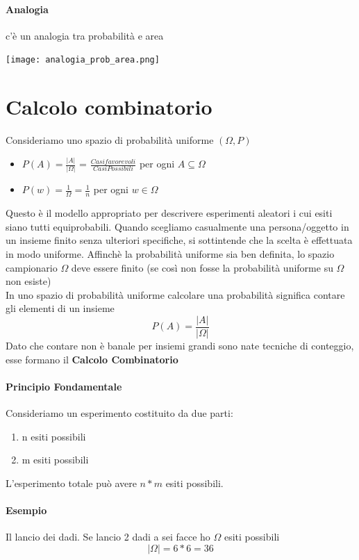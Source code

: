 \documentclass[12pt, a4paper, openany]{book}
\begin{document}
\paragraph{Analogia} c'è un analogia tra probabilità e area
\begin{center}
    \texttt{[image: analogia\_prob\_area.png]}
\end{center}

\section{Calcolo combinatorio}
Consideriamo uno spazio di probabilità uniforme $(\Omega, P)$
\begin{itemize}
    \item $P(A) = \frac{|A|}{|\Omega|}$ = $\frac{Casi favorevoli}{Casi Possibili}$
    per ogni $A \subseteq \Omega$
    \item $P({w}) = \frac{1}{\Omega} = \frac{1}{n}$ per ogni $w \in \Omega$
\end{itemize}
Questo è il modello appropriato per descrivere esperimenti aleatori i cui esiti
siano tutti equiprobabili. Quando scegliamo casualmente una persona/oggetto in un 
insieme finito senza ulteriori specifiche, si sottintende che la scelta è effettuata
in modo uniforme.
Affinchè la probabilità uniforme sia ben definita, lo spazio campionario $\Omega$
deve essere finito (se così non fosse la probabilità uniforme su $\Omega$ non esiste)
\\ In uno spazio di probabilità uniforme calcolare una probabilità significa contare gli 
elementi di un insieme
\begin{equation}
    P(A) = \frac{|A|}{|\Omega|}
\end{equation}
Dato che contare non è banale per insiemi grandi sono nate tecniche di conteggio,
esse formano il \textbf{Calcolo Combinatorio}
\paragraph{Principio Fondamentale} Consideriamo un esperimento costituito da due parti:
\begin{enumerate}
    \item n esiti possibili
    \item m esiti possibili
\end{enumerate}
L'esperimento totale può avere $n*m$ esiti possibili.
\paragraph{Esempio} Il lancio dei dadi. Se lancio 2 dadi a sei facce ho $\Omega$ 
esiti possibili
\begin{equation}
    |\Omega| = 6*6 = 36
\end{equation}
\end{document}
